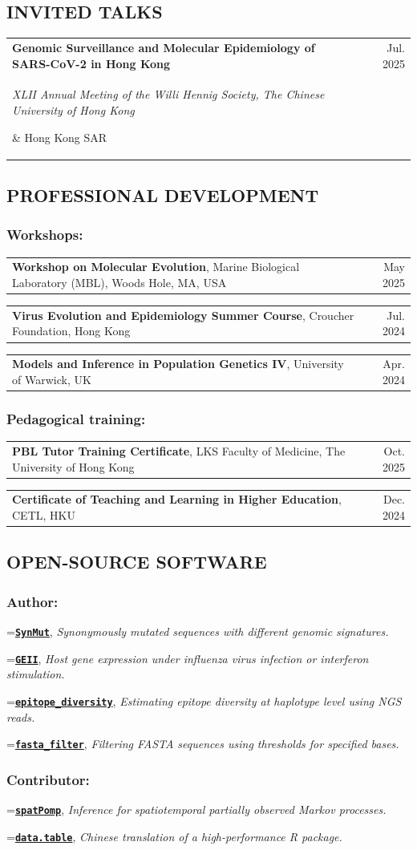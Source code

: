 \documentclass[letterpaper,10pt]{article}
\makeatletter
\newcommand{\subnote}[1]{{\small\itshape #1}}
\newlength{\entrysep}
\newlength{\categoryindent}
\newlength{\detailindent}
\newcommand{\detailcell}[1]{%
  \hspace*{\detailindent}\parbox[t]{\dimexpr\linewidth-\detailindent\relax}{\raggedright\small\itshape #1}%
}
\newcommand{\categoryline}[1]{%
  {\leftskip=\categoryindent\relax\noindent #1\par}%
}
\newcommand{\talkentry}[4]{%
  \Needspace{3\baselineskip}%
  \noindent\begin{tabularx}{\linewidth}{@{}>{\raggedright\arraybackslash}X r@{}}
    \textbf{#1} & #3 \\
    \detailcell{#2} & {\small #4}
  \end{tabularx}\par\vspace{\entrysep}%
}
\newcommand{\developmententry}[3]{%
  \Needspace{2\baselineskip}%
  \noindent\begin{tabularx}{\linewidth}{@{\hspace{\categoryindent}}>{\raggedright\arraybackslash}X r@{}}
    \textbf{#1}, #2 & #3
  \end{tabularx}\par\vspace{\entrysep}%
}
\newcommand{\softwareentry}[3]{%
  \Needspace{2\baselineskip}%
  \categoryline{\href{#1}{\textbf{\texttt{#2}}}, \subnote{#3}}%
  \vspace{\entrysep}%
}
\makeatother
\begin{document}
\subsection*{INVITED TALKS}
\talkentry{Genomic Surveillance and Molecular Epidemiology of SARS-CoV-2 in Hong Kong}
{XLII Annual Meeting of the Willi Hennig Society, The Chinese University of Hong Kong}
{Jul. 2025}{Hong Kong SAR}

\subsection*{PROFESSIONAL DEVELOPMENT}
\subsubsection*{Workshops:}
\developmententry{Workshop on Molecular Evolution}{Marine Biological Laboratory (MBL), Woods Hole, MA, USA}{May 2025}
\developmententry{Virus Evolution and Epidemiology Summer Course}{Croucher Foundation, Hong Kong}{Jul. 2024}
\developmententry{Models and Inference in Population Genetics IV}{University of Warwick, UK}{Apr. 2024}
\subsubsection*{Pedagogical training:}
\developmententry{PBL Tutor Training Certificate}{LKS Faculty of Medicine, The University of Hong Kong}{Oct. 2025}
\developmententry{Certificate of Teaching and Learning in Higher Education}{CETL, HKU}{Dec. 2024}

\subsection*{OPEN-SOURCE SOFTWARE}
\subsubsection*{Author:}
\softwareentry{https://doi.org/10.18129/B9.bioc.SynMut}{SynMut}{Synonymously mutated sequences with different genomic signatures.}
\softwareentry{https://github.com/Leo-Poon-Lab/GEII}{GEII}{Host gene expression under influenza virus infection or interferon stimulation.}
\softwareentry{https://github.com/Koohoko/epitope_diversity}{epitope\_diversity}{Estimating epitope diversity at haplotype level using NGS reads.}
\softwareentry{https://github.com/Koohoko/fasta_filter}{fasta\_filter}{Filtering FASTA sequences using thresholds for specified bases.}
\subsubsection*{Contributor:}
\softwareentry{https://github.com/spatPomp-org/spatPomp}{spatPomp}{Inference for spatiotemporal partially observed Markov processes.}
\softwareentry{https://github.com/Rdatatable/data.table}{data.table}{Chinese translation of a high-performance R package.}
\end{document}
